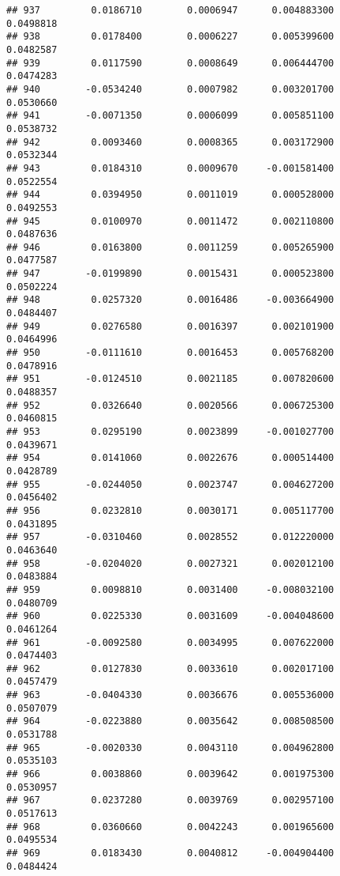 \documentclass[
]{article}
\begin{document}
\begin{verbatim}
## 937         0.0186710        0.0006947      0.004883300             0.0498818
## 938         0.0178400        0.0006227      0.005399600             0.0482587
## 939         0.0117590        0.0008649      0.006444700             0.0474283
## 940        -0.0534240        0.0007982      0.003201700             0.0530660
## 941        -0.0071350        0.0006099      0.005851100             0.0538732
## 942         0.0093460        0.0008365      0.003172900             0.0532344
## 943         0.0184310        0.0009670     -0.001581400             0.0522554
## 944         0.0394950        0.0011019      0.000528000             0.0492553
## 945         0.0100970        0.0011472      0.002110800             0.0487636
## 946         0.0163800        0.0011259      0.005265900             0.0477587
## 947        -0.0199890        0.0015431      0.000523800             0.0502224
## 948         0.0257320        0.0016486     -0.003664900             0.0484407
## 949         0.0276580        0.0016397      0.002101900             0.0464996
## 950        -0.0111610        0.0016453      0.005768200             0.0478916
## 951        -0.0124510        0.0021185      0.007820600             0.0488357
## 952         0.0326640        0.0020566      0.006725300             0.0460815
## 953         0.0295190        0.0023899     -0.001027700             0.0439671
## 954         0.0141060        0.0022676      0.000514400             0.0428789
## 955        -0.0244050        0.0023747      0.004627200             0.0456402
## 956         0.0232810        0.0030171      0.005117700             0.0431895
## 957        -0.0310460        0.0028552      0.012220000             0.0463640
## 958        -0.0204020        0.0027321      0.002012100             0.0483884
## 959         0.0098810        0.0031400     -0.008032100             0.0480709
## 960         0.0225330        0.0031609     -0.004048600             0.0461264
## 961        -0.0092580        0.0034995      0.007622000             0.0474403
## 962         0.0127830        0.0033610      0.002017100             0.0457479
## 963        -0.0404330        0.0036676      0.005536000             0.0507079
## 964        -0.0223880        0.0035642      0.008508500             0.0531788
## 965        -0.0020330        0.0043110      0.004962800             0.0535103
## 966         0.0038860        0.0039642      0.001975300             0.0530957
## 967         0.0237280        0.0039769      0.002957100             0.0517613
## 968         0.0360660        0.0042243      0.001965600             0.0495534
## 969         0.0183430        0.0040812     -0.004904400             0.0484424

\end{verbatim}
\end{document}
